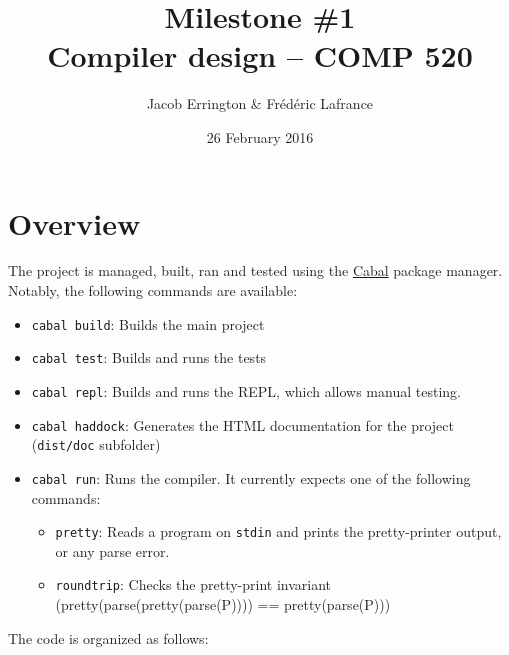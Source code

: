 \documentclass[letterpaper,11pt]{article}
\title{Milestone \#1\\Compiler design -- COMP 520}
\author{Jacob Errington \& Fr\'ed\'eric Lafrance}
\date{26 February 2016}
\begin{document}
\maketitle

\section{Overview}
The project is managed, built, ran and tested using the \href{https://www.haskell.org/cabal/}{Cabal} package manager. Notably, the following commands are available:
\begin{itemize}
\item\texttt{cabal build}: Builds the main project
\item\texttt{cabal test}: Builds and runs the tests
\item\texttt{cabal repl}: Builds and runs the REPL, which allows manual testing.
\item\texttt{cabal haddock}: Generates the HTML documentation for the project (\texttt{dist/doc} subfolder)
\item\texttt{cabal run}: Runs the compiler. It currently expects one of the following commands:
	\begin{itemize}
	\item\texttt{pretty}: Reads a program on \texttt{stdin} and prints the pretty-printer output, or any parse error.
	\item\texttt{roundtrip}: Checks the pretty-print invariant (pretty(parse(pretty(parse(P)))) == pretty(parse(P)))
	\end{itemize}
\end{itemize}
The code is organized as follows:
\end{document}
